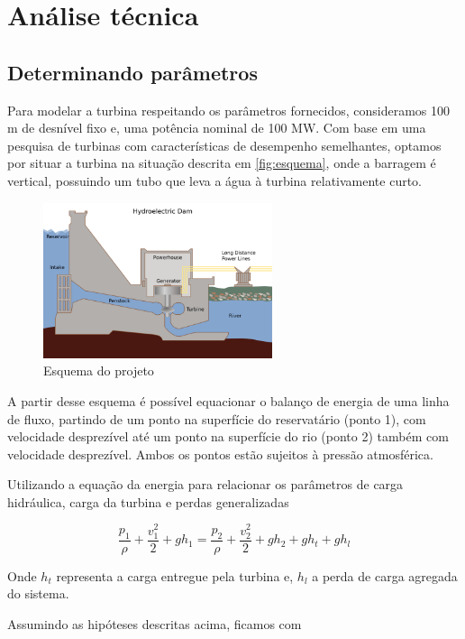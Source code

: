 \chapter{Análise técnica}\label{chp:Técnica}

\section{Determinando parâmetros}

Para modelar a  turbina respeitando os parâmetros fornecidos, consideramos 100 m de desnível fixo e, uma potência nominal de 100 MW.
Com base em uma pesquisa de turbinas com características de desempenho semelhantes, optamos por situar a turbina na situação descrita em \eqref{fig:esquema}, onde a barragem é vertical, possuindo um tubo que leva a água à turbina relativamente curto.

\begin{figure}[!h]
    \centering
    \includegraphics[width=0.6\textwidth]{figuras/scheme 2.png}
    \caption{Esquema do projeto}
    \label{fig:esquema}
\end{figure}

A partir desse esquema é possível equacionar o balanço de energia de uma linha de fluxo, partindo de um ponto na superfície do reservatário (ponto 1), com velocidade desprezível até um ponto na superfície do rio (ponto 2) também com velocidade desprezível. Ambos os pontos estão sujeitos à pressão atmosférica.

Utilizando a equação da energia para relacionar os parâmetros de carga hidráulica, carga da turbina e perdas generalizadas

\[\dfrac{p_1}{\rho}+\dfrac{v_1^2}{2}+gh_1 = \dfrac{p_2}{\rho}+\dfrac{v_2^2}{2}+gh_2 + gh_t + gh_l\]

Onde $h_t$ representa a carga entregue pela turbina e, $h_l$ a perda de carga agregada do sistema.

Assumindo as hipóteses descritas acima, ficamos com

